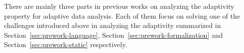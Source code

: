 There are mainly three parts in previous works on analyzing the adaptivity property
for adaptive data analysis.
Each of them focus on solving one of the challenges introduced above in analyzing the adaptivity
summarized in Section~\ref{sec:prework-language},
Section~\ref{sec:prework-formalization} 
and Section~\ref{sec:prework-static} respectively.